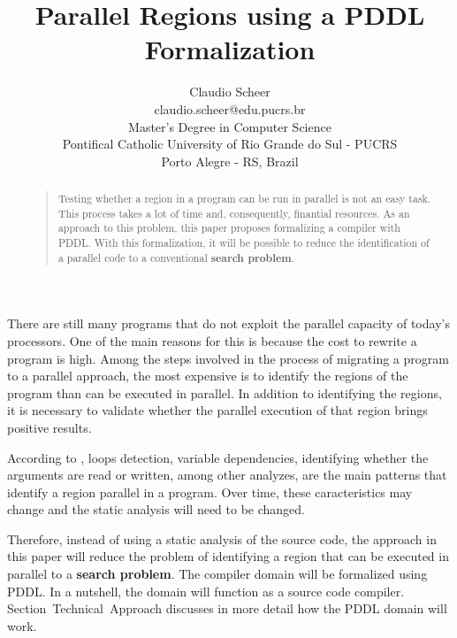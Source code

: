 \documentclass[letterpaper]{article}
\begin{document}
\title{Parallel Regions using a PDDL Formalization}
\author{Claudio Scheer\\
  claudio.scheer@edu.pucrs.br\\
  Master's Degree in Computer Science\\
  Pontifical Catholic University of Rio Grande do Sul - PUCRS\\
  Porto Alegre - RS, Brazil\\
}
\maketitle

\begin{abstract}
  \begin{quote}
    Testing whether a region in a program can be run in parallel is not an easy task. This process takes a lot of time and, consequently, finantial resources. As an approach to this problem, this paper proposes formalizing a compiler with PDDL. With this formalization, it will be possible to reduce the identification of a parallel code to a conventional \textbf{search problem}.
  \end{quote}
\end{abstract}

\noindent There are still many programs that do not exploit the parallel capacity of today's processors. One of the main reasons for this is because the cost to rewrite a program is high. Among the steps involved in the process of migrating a program to a parallel approach, the most expensive is to identify the regions of the program than can be executed in parallel. In addition to identifying the regions, it is necessary to validate whether the parallel execution of that region brings positive results.

According to \cite{doi:10.1177/1094342017695639}, loops detection, variable dependencies, identifying whether the arguments are read or written, among other analyzes, are the main patterns that identify a region parallel in a program. Over time, these caracteristics may change and the static analysis will need to be changed.

Therefore, instead of using a static analysis of the source code, the approach in this paper will reduce the problem of identifying a region that can be executed in parallel to a \textbf{search problem}. The compiler domain will be formalized using PDDL. In a nutshell, the domain will function as a source code compiler. Section~Technical~Approach discusses in more detail how the PDDL domain will work.
\end{document}
